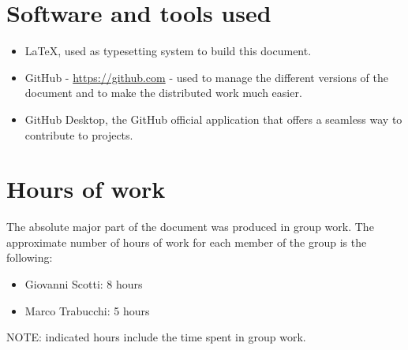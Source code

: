 \section{Software and tools used}
\begin{itemize}
\item \LaTeX, used as typesetting system to build this document.
\item GitHub - \url{https://github.com} - used to manage the different versions of the document and to make the distributed work much easier.
\item GitHub Desktop, the GitHub official application that offers a seamless way to contribute to projects.
\end{itemize}
\section{Hours of work}
The absolute major part of the document was produced in group work. The approximate number of hours of work for each member of the group is the following:

\begin{itemize}
\item Giovanni Scotti: 8 hours
\item Marco Trabucchi: 5 hours
\end{itemize}

NOTE: indicated hours include the time spent in group work.